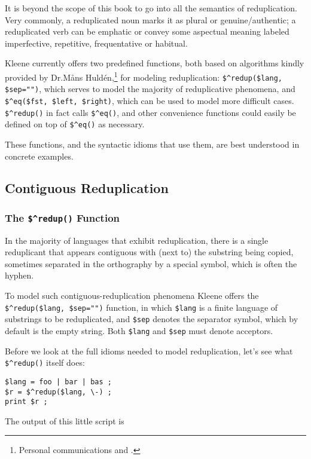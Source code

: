 It is beyond the scope of this book to go into all the semantics of reduplication.  Very commonly, a
reduplicated noun marks it as plural or genuine/authentic; a reduplicated verb can be emphatic or convey
some aspectual meaning labeled imperfective, repetitive, frequentative or habitual.

Kleene currently 
offers two predefined functions, 
both based on algorithms kindly 
provided by Dr.\@ M\r{a}ns Huldén,\footnote{Personal communications and 
\citet{Hulden:2009:SFC:1564035.1564059}.} for modeling reduplication:  \verb!$^redup($lang, $sep="")!, which
serves to model the majority of reduplicative phenomena, and \verb!$^eq($fst, $left, $right)!, which
can be used to model more difficult cases.  \verb!$^redup()! in fact
calls \verb!$^eq()!, and other convenience functions could easily be defined on top of \verb!$^eq()!
as necessary.

These functions, and the syntactic idioms that use them, are best understood in concrete examples.


\subsection{Contiguous Reduplication}

\cprotect\subsubsection{The \verb!$^redup()! Function}

In the majority of languages that exhibit reduplication, there is a single
reduplicant that appears contiguous with (next to) the substring being
copied, sometimes 
separated in the orthography by a special symbol, which is often the hyphen.

To model such contiguous-reduplication phenomena Kleene offers the \verb!$^redup($lang, $sep="")! function,
in which \verb!$lang! is a finite language of substrings to be reduplicated, and \verb!$sep!
denotes the separator symbol, which by default is the empty string.  Both \verb!$lang! and \verb!$sep! must
denote acceptors.

Before we look at the full idioms needed to model reduplication, let's see
what \verb!$^redup()! itself does:

\begin{Verbatim}
$lang = foo | bar | bas ;
$r = $^redup($lang, \-) ;
print $r ;
\end{Verbatim}

\noindent
The output of this little script is

